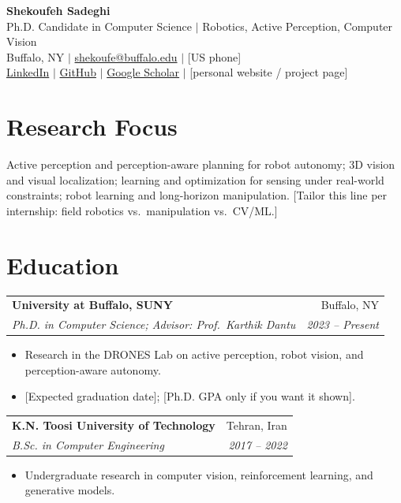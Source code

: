 \documentclass[10.5pt,letterpaper]{article}
\makeatletter
\newcommand{\todo}[1]{\textcolor{placeholder}{[#1]}}
\newcommand{\resumeSubheading}[4]{
  \begin{tabularx}{\textwidth}{@{}Xr@{}}
    \textbf{#1} & #2 \\
    \textit{#3} & \textit{#4}
  \end{tabularx}
  \vspace{-2pt}
}
\newcommand{\resumeItem}[1]{\item \small #1}
\makeatother
\begin{document}
\begin{center}
    {\LARGE \textbf{Shekoufeh Sadeghi}}\\[3pt]
    \small
    Ph.D. Candidate in Computer Science $\mid$ Robotics, Active Perception, Computer Vision\\[3pt]
    Buffalo, NY $\mid$
    \href{mailto:shekoufe@buffalo.edu}{shekoufe@buffalo.edu} $\mid$
    \todo{US phone}\\[2pt]
    \href{https://www.linkedin.com/in/shekoufeh-sadeghi-45100a1ba/}{LinkedIn} $\mid$
    \href{https://github.com/cikufa}{GitHub} $\mid$
    \href{https://scholar.google.com/citations?hl=en&user=NCCK7doAAAAJ}{Google Scholar}
    $\mid$ \todo{personal website / project page}
\end{center}

\vspace{-5pt}

\section{Research Focus}
\small
Active perception and perception-aware planning for robot autonomy; 3D vision and visual localization;
learning and optimization for sensing under real-world constraints; robot learning and long-horizon manipulation.
\todo{Tailor this line per internship: field robotics vs.\ manipulation vs.\ CV/ML.}

\section{Education}

\resumeSubheading
{University at Buffalo, SUNY}{Buffalo, NY}
{Ph.D. in Computer Science; Advisor: Prof.\ Karthik Dantu}{2023 -- Present}
\begin{itemize}
    \resumeItem{Research in the DRONES Lab on active perception, robot vision, and perception-aware autonomy.}
    \resumeItem{\todo{Expected graduation date}; \todo{Ph.D. GPA only if you want it shown}.}
\end{itemize}

\resumeSubheading
{K.N. Toosi University of Technology}{Tehran, Iran}
{B.Sc. in Computer Engineering}{2017 -- 2022}
\begin{itemize}
    \resumeItem{Undergraduate research in computer vision, reinforcement learning, and generative models.}
\end{itemize}
\end{document}
